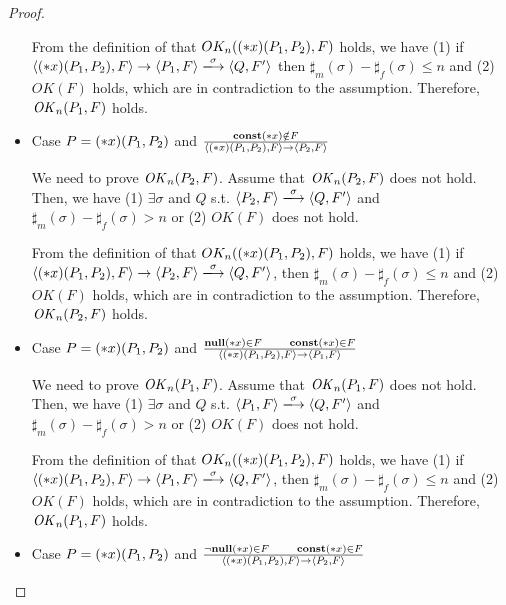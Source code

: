 \begin{proof}
\begin{itemize}
  From the definition of that \(OK_n((*x)(P_1, P_2), F)\) holds, we
  have (1) if \( \langle \Sirx(P_1, P_2), F \rangle \rightarrow
  \langle P_1, F \rangle \xlongrightarrow{\sigma} \langle Q, F'
  \rangle \) then \(\sharp_m(\sigma) -
  \sharp_f(\sigma) \le n \) and (2) \(OK(F)\) holds, which are in
  contradiction to the assumption.  Therefore, \(\mathit{OK}_n(P_1, F)\)
  holds.

\item Case \( P = (*x)(P_1,P_2) \) and \( \frac{ \mathbf{const}(*x) \notin F}
  { \langle (*x)(P_1, P_2), F \rangle \rightarrow \langle P_2, F
    \rangle } \)

  We need to prove \(\mathit{OK}_n(P_2, F)\).  Assume that \(\mathit{OK}_n(P_2, F)\)
  does not hold. Then, we have (1) \( \exists \sigma \) and \(Q\)
  s.t. \( \langle P_2, F \rangle \xlongrightarrow{\sigma} \langle Q,
  F' \rangle \) and \(\sharp_{m}(\sigma) -
  \sharp_{f}(\sigma) > n\) or (2) \( OK(F)\) does not hold.

  From the definition of that \(OK_n((*x)(P_1, P_2), F)\) holds, we
  have (1) if \( \langle \Sirx(P_1, P_2), F \rangle \rightarrow
  \langle P_2, F \rangle \xlongrightarrow{\sigma} \langle Q, F'
  \rangle \), then \(\sharp_m(\sigma) -
  \sharp_f(\sigma) \le n \) and (2) \(OK(F)\) holds, which are in
  contradiction to the assumption.  Therefore, \(\mathit{OK}_n(P_2, F)\)
  holds.

\item Case \( P = (*x)(P_1,P_2) \) and \( \frac{ {\bf null}(*x) \in F
  \quad\quad \mathbf{const}(*x) \in F} { \langle (*x)(P_1, P_2), F \rangle
  \rightarrow \langle P_1, F \rangle } \)

  We need to prove \(\mathit{OK}_n(P_1, F)\).  Assume that \(\mathit{OK}_n(P_1, F)\)
  does not hold. Then, we have (1) \( \exists \sigma \) and \(Q\)
  s.t. \( \langle P_1, F \rangle \xlongrightarrow{\sigma} \langle Q,
  F' \rangle \) and \(\sharp_{m}(\sigma) -
  \sharp_{f}(\sigma) > n\) or (2) \( OK(F)\) does not hold.

  From the definition of that \(OK_n((*x)(P_1, P_2), F)\) holds, we
  have (1) if \( \langle \Sirx(P_1, P_2), F \rangle \rightarrow
  \langle P_1, F \rangle \xlongrightarrow{\sigma} \langle Q, F'
  \rangle \), then \(\sharp_m(\sigma) -
  \sharp_f(\sigma) \le n \) and (2) \(OK(F)\) holds, which are in
  contradiction to the assumption.  Therefore, \(\mathit{OK}_n(P_1, F)\)
  holds.

\item Case \( P = (*x)(P_1,P_2) \) and \( \frac{ \neg{\bf null}(*x) \in F
  \quad\quad \mathbf{const}(*x) \in F} { \langle (*x)(P_1, P_2), F \rangle
  \rightarrow \langle P_2, F \rangle } \)


\end{itemize}
\end{proof}
